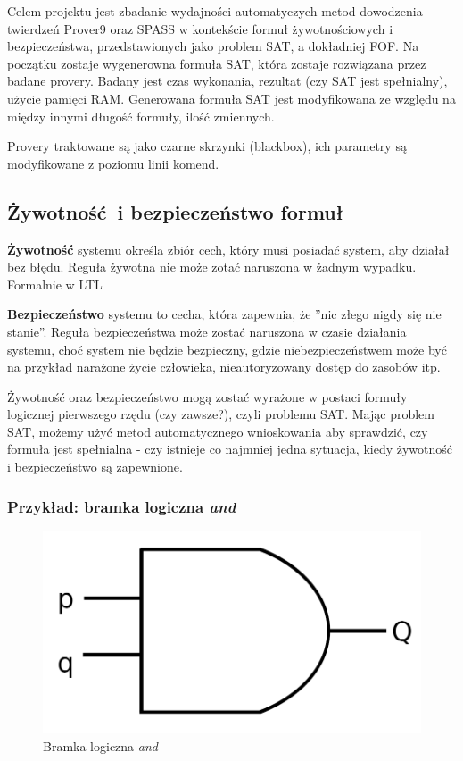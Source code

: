 \documentclass[a4paper,12pt]{article}
\begin{document}
Celem projektu jest zbadanie wydajności automatyczych metod dowodzenia twierdzeń Prover9 oraz SPASS w kontekście formuł żywotnościowych i bezpieczeństwa, przedstawionych jako problem \gls{SAT}, a dokładniej \gls{FOF}. Na początku zostaje wygenerowna formuła \gls{SAT}, która zostaje rozwiązana przez badane provery. Badany jest czas wykonania, rezultat (czy \gls{SAT} jest spełnialny), użycie pamięci RAM.  Generowana formuła \gls{SAT} jest modyfikowana ze względu na między innymi długość formuły, ilość zmiennych.

Provery traktowane są jako czarne skrzynki (blackbox), ich parametry są modyfikowane z poziomu linii komend.

\subsection{Żywotność i bezpieczeństwo formuł}

\textbf{Żywotność} systemu określa zbiór cech, który musi posiadać system, aby działał bez błędu. Reguła żywotna nie może zotać naruszona w żadnym wypadku. Formalnie w \gls{LTL} 

\textbf{Bezpieczeństwo} systemu to cecha, która zapewnia, że ''nic złego nigdy się nie stanie''. Reguła bezpieczeństwa może zostać naruszona w czasie działania systemu, choć system nie będzie bezpieczny, gdzie niebezpieczeństwem może być na przykład narażone życie człowieka, nieautoryzowany dostęp do zasobów itp.

Żywotność oraz bezpieczeństwo mogą zostać wyrażone w postaci formuły logicznej pierwszego rzędu (czy zawsze?), czyli problemu SAT. Mając problem SAT, możemy użyć metod automatycznego wnioskowania aby sprawdzić, czy formuła jest spełnialna - czy istnieje co najmniej jedna sytuacja, kiedy żywotność i bezpieczeństwo są zapewnione.

\subsubsection{Przykład: bramka logiczna \textit{and}}

\begin{figure}[H]
  \centering
  \includegraphics[scale=0.5]{images/AND.png}
  \caption{Bramka logiczna \textit{and}}
\end{figure}
\end{document}
